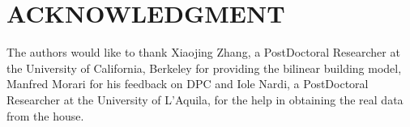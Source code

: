 \section*{ACKNOWLEDGMENT}
The authors would like to thank Xiaojing Zhang, a PostDoctoral Researcher at the University of California, Berkeley for providing the bilinear building model, Manfred Morari for his feedback on DPC and Iole Nardi, a PostDoctoral Researcher at the University of L'Aquila, for the help in obtaining the real data from the house.